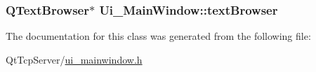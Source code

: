\subsubsection[{\texorpdfstring{text\+Browser}{textBrowser}}]{\setlength{\rightskip}{0pt plus 5cm}Q\+Text\+Browser$\ast$ Ui\+\_\+\+Main\+Window\+::text\+Browser}\hypertarget{class_ui___main_window_a2c789c07fa5fc1cee05aae8df52bb02d}{}\label{class_ui___main_window_a2c789c07fa5fc1cee05aae8df52bb02d}


The documentation for this class was generated from the following file\+:\begin{DoxyCompactItemize}
\item 
Qt\+Tcp\+Server/\hyperlink{ui__mainwindow_8h}{ui\+\_\+mainwindow.\+h}\end{DoxyCompactItemize}
